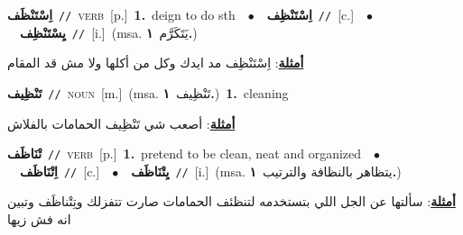 \documentclass[10pt,a4paper,twoside]{article} %
\begin{document}
\begin{multicols}{2}
{\setlength\topsep{0pt}\textbf{\foreignlanguage{arabic}{اِسْتَنْظَف}}\ {\color{gray}\texttt{//}\color{black}}\ \textsc{verb}\ [p.]\ \textbf{1.}~deign to do sth\ \ $\bullet$\ \ \setlength\topsep{0pt}\textbf{\foreignlanguage{arabic}{اِسْتَنْظِف}}\ {\color{gray}\texttt{//}\color{black}}\ [c.]\ \ $\bullet$\ \ \setlength\topsep{0pt}\textbf{\foreignlanguage{arabic}{يِسْتَنْظِف}}\ {\color{gray}\texttt{//}\color{black}}\ [i.]\ \color{gray}(msa. \foreignlanguage{arabic}{يَتَكَرَّم}~\foreignlanguage{arabic}{\textbf{١.}})\color{black}\  \begin{flushright}\color{gray}\foreignlanguage{arabic}{\textbf{\underline{\foreignlanguage{arabic}{أمثلة}}}: اِسْتَنْظِف مد ايدك وكل من أكلها ولا مش قد المقام}\end{flushright}\color{black}} \vspace{2mm}

{\setlength\topsep{0pt}\textbf{\foreignlanguage{arabic}{تَنْظِيف}}\ {\color{gray}\texttt{//}\color{black}}\ \textsc{noun}\ [m.]\ \color{gray}(msa. \foreignlanguage{arabic}{تَنْظِيف}~\foreignlanguage{arabic}{\textbf{١.}})\color{black}\ \textbf{1.}~cleaning\  \begin{flushright}\color{gray}\foreignlanguage{arabic}{\textbf{\underline{\foreignlanguage{arabic}{أمثلة}}}: أصعب شي تَنْظِيف الحمامات بالفلاش}\end{flushright}\color{black}} \vspace{2mm}

{\setlength\topsep{0pt}\textbf{\foreignlanguage{arabic}{تْنَاظَف}}\ {\color{gray}\texttt{//}\color{black}}\ \textsc{verb}\ [p.]\ \textbf{1.}~pretend to be clean, neat and organized\ \ $\bullet$\ \ \setlength\topsep{0pt}\textbf{\foreignlanguage{arabic}{اِتْنَاظَف}}\ {\color{gray}\texttt{//}\color{black}}\ [c.]\ \ $\bullet$\ \ \setlength\topsep{0pt}\textbf{\foreignlanguage{arabic}{يِتْنَاظَف}}\ {\color{gray}\texttt{//}\color{black}}\ [i.]\ \color{gray}(msa. \foreignlanguage{arabic}{يتظاهر بالنظافة والترتيب}~\foreignlanguage{arabic}{\textbf{١.}})\color{black}\  \begin{flushright}\color{gray}\foreignlanguage{arabic}{\textbf{\underline{\foreignlanguage{arabic}{أمثلة}}}: سألتها عن الجل اللي بتستخدمه لتنظئف الحمامات صارت تتفزلك وتِتْناظَف وتبين انه فش زيها}\end{flushright}\color{black}} \vspace{2mm}


\end{multicols}
\end{document}
